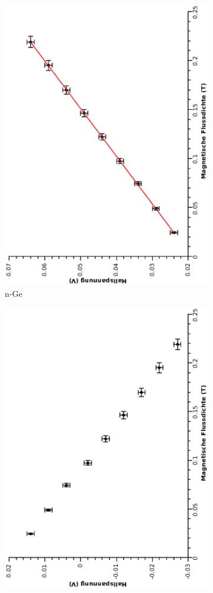 \documentclass[12pt,a4paper,twopage]{article}
\begin{document}
\begin{figure}
\begin{subfigure}{0.4\textwidth}
\includegraphics[width=0.9\linewidth, angle=-90]{npe.eps}
\caption{n-Ge}
\end{subfigure}
\begin{subfigure}{0.4\textwidth}
\includegraphics[width=0.9\linewidth, angle=-90]{npeumpol.eps}

\end{subfigure}
\end{figure}
\end{document}
